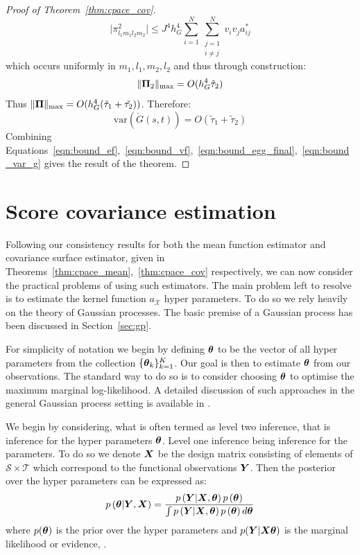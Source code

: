 \begin{proof}[Proof of Theorem~\ref{thm:cpace_cov}]
\begin{equation}
	\lvert \pi_{l_1m_1l_2m_2}^2  \rvert \leq J^4 h_G^4 \sum_{i=1}^N \sum_{\substack{j=1 \\ i \ne j}}^N v_i v_j a_{ij}^* 
\end{equation}
which occurs uniformly in $m_1, l_1, m_2, l_2$ and thus through construction:
\begin{equation}
	\lVert \bm{{\Pi}}_{2} \rVert_\text{max} = O(h_G^4 \tilde{\tau}_2)
\end{equation}
Thus $\lVert \bm{{\Pi}} \rVert_\text{max} = O(h_G^4(\tilde{\tau}_1 + \tilde{\tau_2}))$.
Therefore:
\begin{equation}
	\text{var}\left(\check{G}(s,t)\right) = O(\tilde{\tau}_1 + \tilde{\tau}_2)
	\label{eqn:bound_var_g}
\end{equation}
Combining Equations~\eqref{eqn:bound_ef},~\eqref{eqn:bound_vf},~\eqref{eqn:bound_egg_final},~\eqref{eqn:bound_var_g} gives the result of the theorem.
\end{proof}

\section{Score covariance estimation \label{sec:cpace_score_estim}}
Following our consistency results for both the mean function estimator and covariance surface estimator, given in Theorems~\ref{thm:cpace_mean},~\ref{thm:cpace_cov} respectively, we can now consider the practical problems of using such estimators.
The main problem left to resolve is to estimate the kernel function $a_\mathcal{X}$  hyper parameters. 
To do so we rely heavily on the theory of Gaussian processes. 
The basic premise of a Gaussian process has been discussed in Section~\ref{sec:gp}.

For simplicity of notation we begin by defining $\bm{{\theta}}$ to be the vector of all hyper parameters from the collection $\{\bm{{\theta}}_{k}\}_{k=1}^K$. 
Our goal is then to estimate $\bm{{\theta}}$ from our observations. 
The standard way to do so is to consider choosing $\bm{{\theta}}$ to optimise the maximum marginal log-likelihood. 
A detailed discussion of such approaches in the general Gaussian process setting is available in \citep{williams_gaussian_2006}.

We begin by considering, what is often termed as level two inference, that is inference for the hyper parameters $\bm{{\theta}}$. 
Level one inference being inference for the parameters. 
To do so we denote $\bm{{X}}$ be the design matrix consisting of elements of $\mathcal{S} \times \mathcal{T}$ which correspond to the functional observations $\bm{{Y}}$. 
Then the posterior over the hyper parameters can be expressed as:
\begin{equation}
	p\left(\bm{{\theta}} | \bm{{Y}},  \bm{{X}} \right) = \frac{p\left(\bm{{Y}} | \bm{{X}}, \bm{{\theta}}\right) p\left(\bm{{\theta}}\right)}{\int p\left(\bm{{Y}} | \bm{{X}}, \bm{{\theta}}\right) p\left(\bm{{\theta}}\right) d\bm{{\theta}}} 
	\label{eqn:bayes_cpace}
\end{equation}
where $p(\bm{{\theta}})$ is the prior over the hyper parameters and $p(\bm{{Y}}| \bm{{X}} \bm{{\theta}})$ is the marginal likelihood or evidence, \citep{williams_gaussian_2006}.


